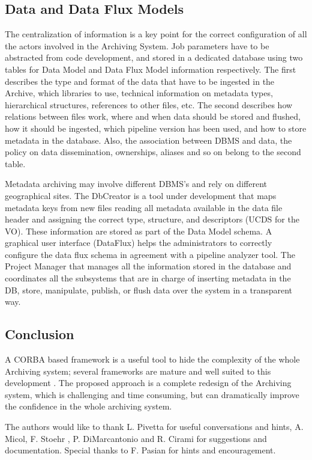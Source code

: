 \subsection{Data and  Data Flux Models}
The centralization of information is a key point for the correct configuration of all the actors involved in the Archiving System. Job parameters have to be abstracted from code development, and stored in a dedicated database using two tables for Data Model and Data Flux Model information respectively. The first describes the type and format of the data that have to be ingested in the Archive, which libraries to use, technical information on metadata types, hierarchical structures, references to other files, etc. The second describes how relations between files work, where and when data should be stored and flushed, how it should be ingested, which pipeline version has been used, and how to store metadata in the database. Also, the association between DBMS and data, the policy on data dissemination, ownerships, aliases and so on belong to the second table.


Metadata archiving may involve different DBMS's and rely on different geographical sites. The DbCreator is a tool under development that maps metadata keys from new files reading all metadata available in the data file header and assigning the correct type, structure, and descriptors (UCDS for the VO). These information are stored as part of the Data Model schema. A graphical user interface (DataFlux) helps the administrators to correctly configure the data flux schema in agreement with a pipeline analyzer tool. The Project Manager that manages all the information stored in the database and coordinates all the subsystems that are in charge of inserting metadata in the DB, store, manipulate, publish, or flush data over the system in a transparent way.

\subsection{Conclusion}
A CORBA based framework is a useful tool to hide the complexity of the whole Archiving system; several frameworks are mature and well suited to this development . The proposed approach is a complete redesign of the Archiving system, which is challenging and time consuming, but can dramatically improve the confidence in the whole archiving system.

\acknowledgements The authors would like to thank L. Pivetta for useful conversations and hints, A. Micol, F. Stoehr , P. DiMarcantonio and R. Cirami for suggestions and documentation. Special thanks to F. Pasian for hints and encouragement.
